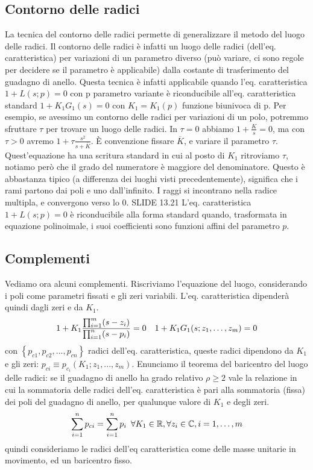 \documentclass[11pt]{article}
\begin{document}
\subsection{Contorno delle radici}
La tecnica del contorno delle radici permette di generalizzare il metodo del luogo delle radici. Il contorno delle radici è infatti un luogo delle radici (dell'eq. caratteristica) per variazioni di un parametro diverso (può variare, ci sono regole per decidere se il parametro è applicabile) dalla costante di trasferimento del guadagno di anello. Questa tecnica è infatti applicabile quando l'eq. caratteristica $1+L(s;p)=0$ con p parametro variante è riconducibile all'eq. caratteristica standard $1+K_1G_1(s)=0$ con $K_1=K_1(p)$ funzione biunivoca di p.
Per esempio, se avessimo un contorno delle radici per variazioni di un polo, potremmo sfruttare $\tau$ per trovare un luogo delle radici. In $\tau=0$ abbiamo $1+\frac{K}{s} =0 $, ma con $\tau>0$ avremo $1+\tau\frac{s^2}{s+\overline{K}}$. È convenzione fissare $\overline{K}$, e variare il parametro $\tau$. Quest'equazione ha una scritura standard in cui al posto di $K_1$ ritroviamo $\tau$, notiamo però che il grado del numeratore è maggiore del denominatore. Questo è abbastanza tipico (a differenza dei luoghi visti precedentemente), significa che i rami partono dai poli e uno dall'infinito. I raggi si incontrano nella radice multipla, e convergono verso lo 0.
SLIDE 13.21
L'eq. caratteristica $1+L(s;p)=0$ è riconducibile alla forma standard quando, trasformata in equazione polinoimale, i suoi coefficienti sono funzioni affini del parametro $p$.
\subsection{Complementi}
Vediamo ora alcuni complementi. Riscriviamo l'equazione del luogo, considerando i poli come parametri fissati e gli zeri variabili. L'eq. caratteristica dipenderà quindi dagli zeri e da $K_1$.
\begin{displaymath}
    1+K_1\frac{\prod_{i=1}^m (s-z_i)}{\prod_{i=1}^n (s-p_i)} = 0 \hspace{10px}1+K_1G_1(s;z_1,\dots,z_m) = 0
\end{displaymath}
con $\left\{p_{c1}, p_{c2},...,p_{cn}\right\}$ radici dell'eq. caratteristica, queste radici dipendono da $K_1$ e gli zeri: $p_{ci}\equiv p_{c_i}(K_1;z_1,...,z_m)$. Enunciamo il teorema del baricentro del luogo delle radici: se il guadagno di anello ha grado relativo $\rho\ge2$ vale la relazione in cui la sommatoria delle radici dell'eq. caratteristica è pari alla sommatoria (fissa) dei poli del guadagno di anello, per qualunque valore di $K_1$ e degli zeri.
\begin{displaymath}
    \sum_{i=1}^n p_{ci} = \sum_{i=1}^n p_i \hspace{5px}\forall K_1 \in \mathbb{R}, \forall z_i \in \mathbb{C}, i=1,\dots,m
\end{displaymath}
quindi consideriamo le radici dell'eq caratteristica come delle masse unitarie in movimento, ed un baricentro fisso.
\end{document}
